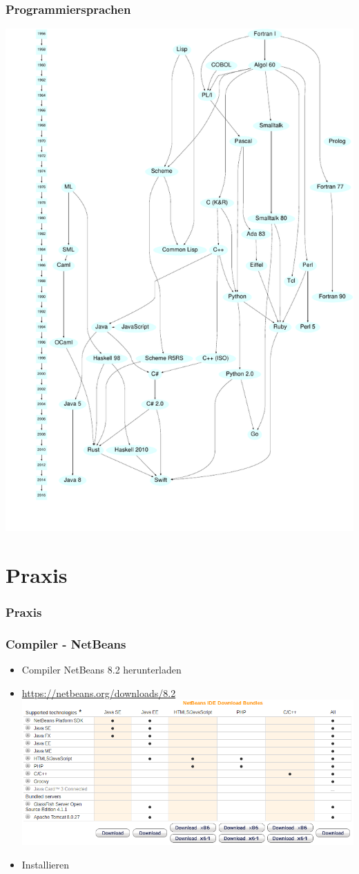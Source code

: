 \documentclass{beamer}
\begin{document}
	\begin{frame}
		\frametitle{Programmiersprachen}
		\centering \includegraphics[height=.85\textheight]{Sprachen-Diagramm.pdf}
	\end{frame}

	\section{Praxis}
	\begin{frame}
		\frametitle{Praxis}
	\end{frame}

	\begin{frame}
		\frametitle{Compiler - NetBeans}
		\begin{itemize}
			\item Compiler NetBeans 8.2 herunterladen
			\item \url{https://netbeans.org/downloads/8.2}
			\includegraphics[width=.5\textwidth]{Netbeans-Download}
			\item Installieren
		\end{itemize}
	\end{frame}
\end{document}
